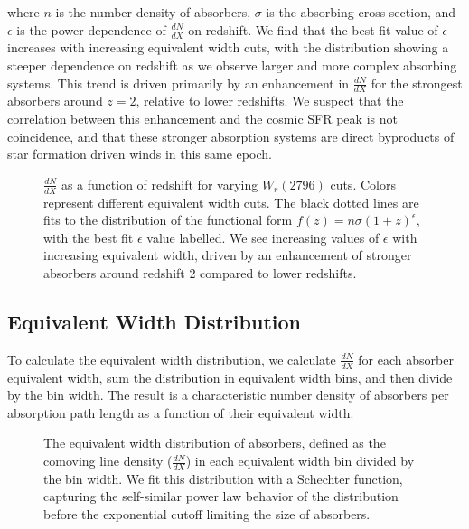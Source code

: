 \documentclass[iop,apj,numberedappendix,appendixfloats,twocolappendix]{emulateapj}
\begin{document}
where $n$ is the number density of {\MgII} absorbers, $\sigma$ is the absorbing cross-section, and $\epsilon$ is the power dependence of $\frac{dN}{dX}$ on redshift. We find that the best-fit value of $\epsilon$ increases with increasing equivalent width cuts, with the distribution showing a steeper dependence on redshift as we observe larger and more complex {\MgII} absorbing systems. This trend is driven primarily by an enhancement in $\frac{dN}{dX}$ for the strongest {\MgII} absorbers around $z = 2$, relative to lower redshifts. We suspect that the correlation between this enhancement and the cosmic SFR peak is not coincidence, and that these stronger {\MgII} absorption systems are direct byproducts of star formation driven winds in this same epoch. 

\begin{figure}[bth]
\caption{$\frac{dN}{dX}$ as a function of redshift for varying $W_r(2796)$ cuts. Colors represent different equivalent width cuts. The black dotted lines are fits to the distribution of the functional form $f(z) = n\sigma (1 + z)^{\epsilon}$, with the best fit $\epsilon$ value labelled. We see increasing values of $\epsilon$ with increasing equivalent width, driven by an enhancement of stronger {\MgII} absorbers around redshift 2 compared to lower redshifts.}
\label{fig:dndx_cuts}
\end{figure}

\subsection{Equivalent Width Distribution}
\label{sec:ewdistro}

To calculate the equivalent width distribution, we calculate $\frac{dN}{dX}$ for each absorber equivalent width, sum the distribution in equivalent width bins, and then divide by the bin width. The result is a characteristic number density of {\MgII} absorbers per absorption path length as a function of their equivalent width.

\begin{figure*}[bth]
\caption{The equivalent width distribution of {\MgII} absorbers, defined as the comoving line density ($\frac{dN}{dX}$) in each equivalent width bin divided by the bin width. We fit this distribution with a Schechter function, capturing the self-similar power law behavior of the distribution before the exponential cutoff limiting the size of {\MgII} absorbers.}
\label{fig:dndx_cuts}
\end{figure*}
\end{document}
